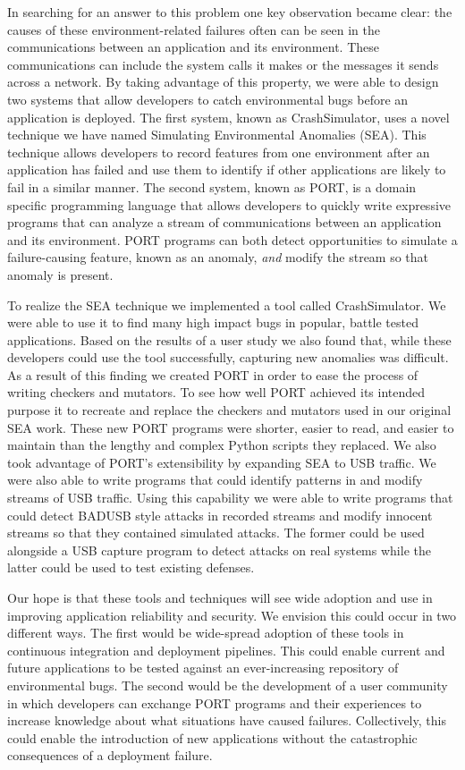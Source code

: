 In searching for an answer to this problem one key observation became clear:
the causes of these environment-related failures
often can be seen in the
communications between an application and its environment. These communications can include the
system calls it makes or the messages it sends across a network.
By taking advantage of this property, we were able to design two systems that allow developers to catch environmental bugs
before an application is deployed. 
The first system, known as CrashSimulator,
uses a novel technique we have named Simulating Environmental Anomalies (SEA).
This technique allows developers to record features from one environment
after an application has failed and use them to identify if other
applications are likely to fail in a similar manner.
The second system,
known as PORT,
is a domain specific programming language that allows developers
to quickly write expressive programs that can analyze a stream of communications between an application and  its environment.
PORT programs can both detect opportunities to
simulate a failure-causing feature, known as an anomaly, \textit{and} modify the stream so that anomaly is present.

To realize the SEA technique we implemented a tool called CrashSimulator.
We were able to use it to find many high impact bugs in popular,
battle tested applications.
Based on the results of a user study we also found that,
while these developers could use the tool successfully,
capturing new anomalies was difficult.
As a result of this finding we created PORT
in order to ease the process of writing checkers and mutators.
To see how well PORT achieved its intended purpose it to recreate and
replace the checkers and mutators used in our original SEA work.
These new PORT programs were shorter, easier to read, and easier to
maintain than the lengthy and complex Python scripts they replaced.
We also took advantage of PORT's extensibility by expanding SEA to USB
traffic.
We were also able to write programs that could identify patterns in and
modify streams of USB traffic.
Using this capability we were able to write programs that could
detect BADUSB style attacks in recorded streams and modify innocent streams
so that they contained simulated attacks.
The former could be used alongside a USB capture program to detect attacks
on real systems while the latter could be used to test existing defenses.

Our hope is that these tools and techniques will see wide
adoption and use in improving application reliability and security. We envision this could occur in two different ways. The first would be wide-spread adoption of these
tools in continuous
integration and deployment pipelines. This could enable current and future
applications to be tested against an ever-increasing repository of
environmental bugs.
The second would be the development of a user community in which developers can exchange PORT programs and their experiences to increase knowledge about what situations have caused failures.  Collectively, 
this could enable the introduction of new applications without the catastrophic consequences of a deployment failure. 

\vspace*{3ex plus 1fil}
